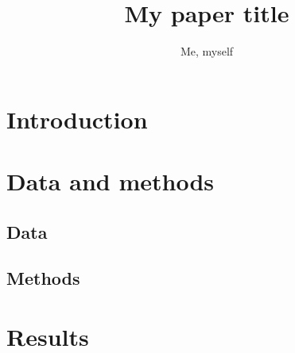 \documentclass{isprs} %
\title{My paper title}
\author{Me, myself}
\begin{document}
\maketitle

\section{Introduction}

\lipsum[1-2]{}

\section{Data and methods}

\subsection{Data}

\lipsum[3]{}

\subsection{Methods}

\lipsum[4]{}

\section{Results}

\lipsum[5-6]{}
\end{document}

